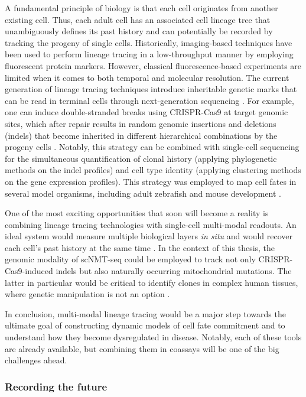 A fundamental principle of biology is that each cell originates from another existing cell. Thus, each adult cell has an associated cell lineage tree that unambiguously defines its past history and can potentially be recorded by tracking the progeny of single cells. Historically, imaging-based techniques have been used to perform lineage tracing in a low-throughput manner by employing fluorescent protein markers. However, classical fluorescence-based experiments are limited when it comes to both temporal and molecular resolution. The current generation of lineage tracing techniques introduce inheritable genetic marks that can be read in terminal cells through next-generation sequencing \cite{Baron2019,Kester2018,McKenna2019}. For example, one can induce double-stranded breaks using CRISPR-Cas9 at target genomic sites, which after repair results in random genomic insertions and deletions (indels) that become inherited in different hierarchical combinations by the progeny cells \cite{Baron2019,Kester2018,McKenna2019}. Notably, this strategy can be combined with single-cell sequencing for the simultaneous quantification of clonal history (applying phylogenetic methods on the indel profiles) and cell type identity (applying clustering methods on the gene expression profiles). This strategy was employed to map cell fates in several model organisms, including adult zebrafish \cite{Alemany2018} and mouse development \cite{Chan2019}. 

One of the most exciting opportunities that soon will become a reality is combining lineage tracing technologies with single-cell multi-modal readouts. An ideal system would measure multiple biological layers \textit{in situ} and would recover each cell's past history at the same time \cite{McKenna2019}. In the context of this thesis, the genomic modality of scNMT-seq could be employed to track not only CRISPR-Cas9-induced indels but also naturally occurring mitochondrial mutations. The latter in particular would be critical to identify clones in complex human tissues, where genetic manipulation is not an option \cite{Ludwig2019}. 

In conclusion, multi-modal lineage tracing would be a major step towards the ultimate goal of constructing dynamic models of cell fate commitment and to understand how they become dysregulated in disease. Notably, each of these tools are already available, but combining them in coassays will be one of the big challenges ahead.

\subsubsection{Recording the future} 

